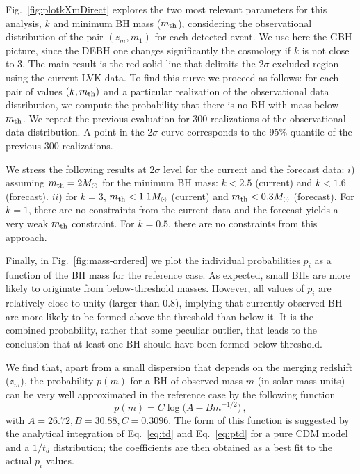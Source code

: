 \documentclass[fleqn,usenatbib,useAMS]{mnras}
\begin{document}
Fig.~\ref{fig:plotkXmDirect} explores the two most relevant parameters for this analysis, $k$ and minimum BH mass ($m_{\rm th}$), considering the observational distribution of the pair $(z_m, m_1)$ for each detected event. We use here the GBH picture, since the DEBH one changes significantly the cosmology if $k$ is not close to 3. The main result is the red solid line that delimits the $2\sigma$ excluded region using the current LVK data. To find this curve we proceed as follows: for each pair of values $(k, m_{\rm th})$ and a particular realization of the observational data distribution, we compute the probability that there is no BH with mass below $m_{\rm th}$. We repeat the previous evaluation for 300 realizations of the observational data distribution. A point in the $2\sigma$ curve corresponds to the 95\% quantile of the previous 300 realizations.

We stress the following results at $2\sigma$ level for the current and the forecast data: $i$) assuming $m_{\rm th} = 2 M_\odot$ for the minimum BH mass: $k < 2.5$ (current) and $k<1.6$ (forecast). $ii$) for $k = 3$, $m_{\rm th} < 1.1 M_\odot$ (current) and $m_{\rm th} < 0.3 M_\odot$ (forecast). For $k=1$, there are no constraints from the current data and the forecast yields a very weak $m_{\rm th}$ constraint. For $k = 0.5$, there are no constraints from this approach.

Finally, in Fig.~\ref{fig:mass-ordered} we plot the individual probabilities $p_i$ as a function of the BH mass for the reference case. As expected, small BHs are more likely to originate from below-threshold masses. However, all values of $p_i$ are relatively close to unity (larger than 0.8), implying that currently observed BH are more likely to be formed above the threshold than below it. It is the combined probability, rather that some peculiar outlier, that leads to the conclusion that at least one BH should have been formed below threshold. 

We find that, apart from a small dispersion that depends on the merging redshift ($z_m$), the probability $p(m)$ for a BH of observed mass $m$ (in solar mass units) can be very well approximated in the reference case by the following function
\begin{equation}\label{eq:bestfit}
    p(m) = C\log\big(A-Bm^{-1/2}\big)\,,
\end{equation}
with $A=26.72,B=30.88,C=0.3096$. The form of this function is suggested  by the analytical integration of Eq.~\eqref{eq:td} and Eq.~\eqref{eq:ptd} for a pure CDM model and a $1/t_d$ distribution; the coefficients are then obtained as a best fit to the actual $p_i$ values.
\end{document}
